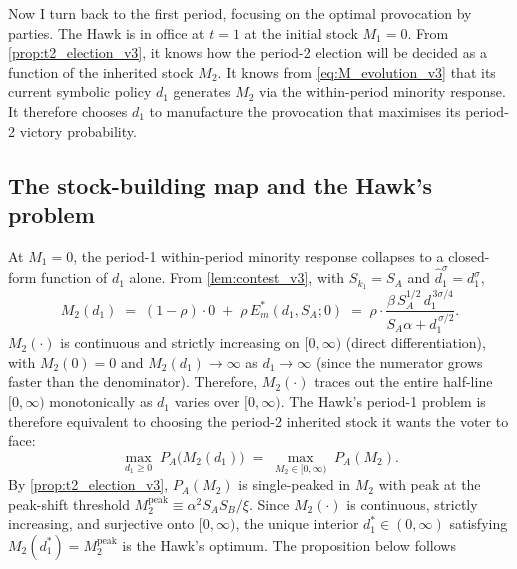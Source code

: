 \documentclass[11pt,twoside]{extarticle}
\begin{document}
Now I turn back to the first period, focusing on the optimal provocation by parties. 
The Hawk is in office at $t=1$ at the initial stock $M_1=0$. From \autoref{prop:t2_election_v3}, it knows how the period-2 election will be decided as a function of the inherited stock $M_2$. It knows from \eqref{eq:M_evolution_v3} that its current symbolic policy $d_1$ generates $M_2$ via the within-period minority response. It therefore chooses $d_1$ to manufacture the provocation that maximises its period-2 victory probability.

\subsection{The stock-building map and the Hawk's problem}\label{subsec:sowing_v3}

At $M_1=0$, the period-1 within-period minority response collapses to a closed-form function of $d_1$ alone. From \autoref{lem:contest_v3}, with $S_{k_1}=S_A$ and $\hat d_1^\sigma=d_1^\sigma$,
\begin{equation}\label{eq:M2_of_d1_v3}
    M_2(d_1)\;=\;(1-\rho)\cdot 0\;+\;\rho\,E_m^*(d_1,S_A;0)\;=\;\rho\cdot\frac{\beta\,S_A^{1/2}\,d_1^{\,3\sigma/4}}{S_A\alpha+d_1^{\,\sigma/2}}.
\end{equation}
$M_2(\cdot)$ is continuous and strictly increasing on $[0,\infty)$ (direct differentiation), with $M_2(0)=0$ and $M_2(d_1)\to\infty$ as $d_1\to\infty$ (since the numerator grows faster than the denominator). Therefore, $M_2(\cdot)$ traces out the entire half-line $[0,\infty)$ monotonically as $d_1$ varies over $[0,\infty)$. The Hawk's period-1 problem is therefore equivalent to choosing the period-2 inherited stock it wants the voter to face:
\begin{equation}\label{eq:hawk_t1_problem_v3}
    \max_{d_1\ge 0}\;P_A\big(M_2(d_1)\big)\;=\;\max_{M_2\in[0,\infty)}\;P_A(M_2).
\end{equation}
By \autoref{prop:t2_election_v3}, $P_A(M_2)$ is single-peaked in $M_2$ with peak at the peak-shift threshold $M_2^{\mathrm{peak}}\equiv\alpha^2 S_A S_B/\xi$. Since $M_2(\cdot)$ is continuous, strictly increasing, and surjective onto $[0,\infty)$, the unique interior $d_1^*\in(0,\infty)$ satisfying $M_2(d_1^*)=M_2^{\mathrm{peak}}$ is the Hawk's optimum. The proposition below follows
\end{document}
